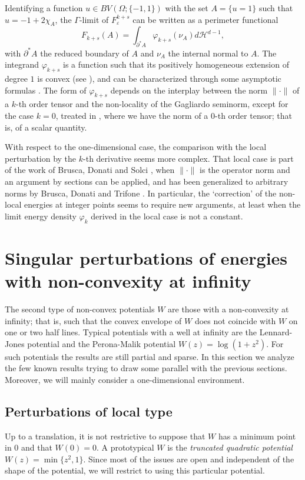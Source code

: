 \documentclass{article}
\newcommand{\e}{\varepsilon}
\begin{document}
Identifying a function $u\in BV(\Omega;\{-1,1\})$ with the set $A=\{u=1\}$ such that $u=-1+2\chi_A$, the $\Gamma$-limit of $F^{k+s}_\e$ can be written as a perimeter functional 
$$
F_{k+s}(A)=\int_{\partial^*A}\varphi_{k+s}(\nu_A)d{\mathcal H}^{d-1},
$$
with $\partial^*A$ the reduced boundary of $A$ and $\nu_A$ the internal normal to $A$.
The integrand $\varphi_{k+s}$ is a function such that its positively homogeneous extension of degree $1$ is convex (see \cite{AmBra}), and can be characterized through some asymptotic formulas \cite{BOP,MR3748585}.
The form of $\varphi_{k+s}$ depends on the interplay between the norm $\|\cdot\|$ of a $k$-th order tensor and the non-locality of the Gagliardo seminorm, except for the case $k=0$, treated in \cite{SV}, where we have the norm of a $0$-th order tensor; that is, of a scalar quantity. 

With respect to the one-dimensional case, the comparison with the local perturbation by the $k$-th derivative  seems more complex. That local case is part of the work of Brusca, Donati and Solci \cite{BDS}, when $\|\cdot\|$ is the operator norm and an argument by sections can be applied, and has been generalized to arbitrary norms by Brusca, Donati and Trifone \cite{BDT}. In particular, the `correction' of the non-local energies at integer points seems  to require new arguments, at least when the limit energy density $\varphi_{k}$ derived in the local case is not a constant.


\section{Singular perturbations of energies with non-convexity at infinity}
The second type of non-convex potentials $W$ are those with a non-convexity at infinity; that is, such that the  convex envelope of $W$ does not coincide with $W$ on one or two half lines. Typical potentials with a well at infinity are the Lennard-Jones potential and the Perona-Malik potential $W(z)=\log(1+z^2)$.  For such potentials the results are still partial and sparse. In this section we analyze the few known results trying to draw some parallel with the previous sections. Moreover, we will mainly consider a one-dimensional environment. 


\subsection{Perturbations of local type}
Up to a translation, it is not restrictive to suppose that $W$ has a minimum point in $0$ and that $W(0)=0$.  
A prototypical $W$ is the {\em truncated quadratic potential} $W(z)=\min\{z^2,1\}$. Since most of the issues are open and independent of the shape of the potential, we will restrict to using this particular potential.
\end{document}
